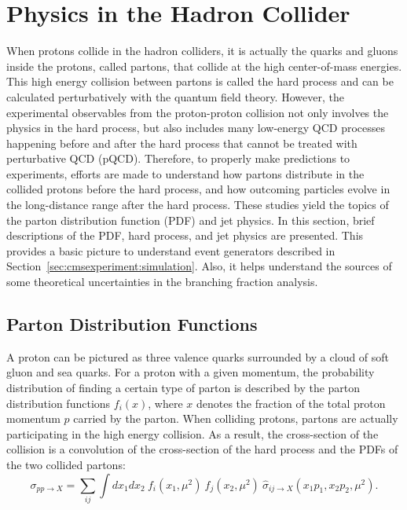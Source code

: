 

\section{Physics in the Hadron Collider}
\label{sec:relatedWorks:ppCollision} 

When protons collide in the hadron colliders, it is actually the quarks and gluons inside the protons, called partons, that collide at the high center-of-mass energies. This high energy collision between partons is called the hard process and can be calculated perturbatively with the quantum field theory. However, the experimental observables from the proton-proton collision not only involves the physics in the hard process, but also includes many low-energy QCD processes happening before and after the hard process that cannot be treated with perturbative QCD (pQCD). Therefore, to properly make predictions to experiments, efforts are made to understand how partons distribute in the collided protons before the hard process, and how outcoming particles evolve in the long-distance range after the hard process. These studies yield the topics of the parton distribution function (PDF) and jet physics. In this section, brief descriptions of the PDF, hard process, and jet physics are presented. This provides a basic picture to understand event generators described in Section~\ref{sec:cmsexperiment:simulation}. Also, it helps understand the sources of some theoretical uncertainties in the \PW branching fraction analysis.

\subsection{Parton Distribution Functions}
\label{sec:relatedWorks:ppCollision:pdf} 


A proton can be pictured as three valence quarks surrounded by a cloud of soft gluon and sea quarks. For a proton with a given momentum, the probability distribution of finding a certain type of parton is described by the parton distribution functions $f_i(x)$, where $x$ denotes the fraction of the total proton momentum $p$ carried by the parton. When colliding protons, partons are actually participating in the high energy collision. As a result, the cross-section of the collision is a convolution of the cross-section of the hard process and the PDFs of the two collided partons:
\begin{equation}
    \sigma_{pp\to X } = \sum_{ij}\int dx_1 dx_2 ~ f_i(x_1, \mu^2) ~ f_j(x_2, \mu^2) ~ \hat{\sigma}_{ij\to X } (x_1 p_1, x_2 p_2,\mu^2) .
    \label{eqn:relatedWorks:qft:ppCollision:factorization}
\end{equation}

